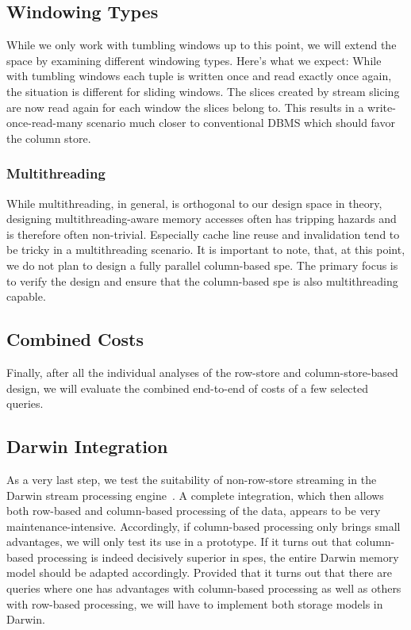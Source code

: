 \subsection{Windowing Types}

While we only work with tumbling windows up to this point, we will extend the space by examining different windowing types.
Here's what we expect: While with tumbling windows each tuple is written once and read exactly once again, the situation is different for sliding windows. 
The slices created by stream slicing are now read again for each window the slices belong to.
This results in a write-once-read-many scenario much closer to conventional DBMS which should favor the column store.

\subsubsection{Multithreading}

While multithreading, in general, is orthogonal to our design space in theory, designing multithreading-aware memory accesses often has tripping hazards and is therefore often non-trivial.
Especially cache line reuse and invalidation tend to be tricky in a multithreading scenario.
It is important to note, that, at this point, we do not plan to design a fully parallel column-based \ac{spe}.
The primary focus is to verify the design and ensure that the column-based \ac{spe} is also multithreading capable.

\subsection{Combined Costs}

Finally, after all the individual analyses of the row-store and column-store-based design, we will evaluate the combined end-to-end of costs of a few selected queries.

\subsection{Darwin Integration}

As a very last step, we test the suitability of non-row-store streaming in the Darwin stream processing engine~\cite[]{DBLP:conf/cidr/BensonR22}.
A complete integration, which then allows both row-based and column-based processing of the data, appears to be very maintenance-intensive.
Accordingly, if column-based processing only brings small advantages, we will only test its use in a prototype.
If it turns out that column-based processing is indeed decisively superior in \acp{spe}, the entire Darwin memory model should be adapted accordingly.
Provided that it turns out that there are queries where one has advantages with column-based processing as well as others with row-based processing, we will have to implement both storage models in Darwin.